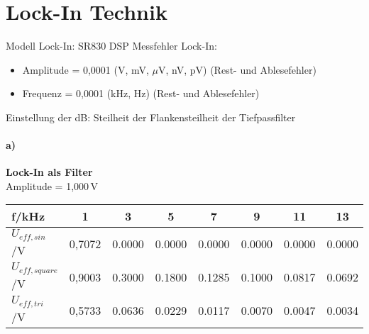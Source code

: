 \section*{Lock-In Technik}
Modell Lock-In: SR830 DSP
Messfehler Lock-In:
\begin{itemize}
    \item Amplitude = 0,0001 (V, mV, $\mu$V, nV, pV) (Rest- und Ablesefehler)
    \item Frequenz = 0,0001 (kHz, Hz) (Rest- und Ablesefehler)
\end{itemize}
Einstellung der dB: Steilheit der Flankensteilheit der Tiefpassfilter
\paragraph{a)}\textbf{Lock-In als Filter}\\
Amplitude = 1,000\,V
\begin{center}
    \begin{tabular}{l | c c c c c c c}
        f/kHz               & 1 & 3 & 5 & 7 & 9 & 11 & 13 \\
        \hline
        $U_{eff,sin}$/V     & 0,7072 & 0.0000 & 0.0000 & 0.0000 & 0.0000 & 0.0000 & 0.0000 \\
        $U_{eff,square}$/V  & 0,9003 & 0.3000 & 0.1800 & 0.1285 & 0.1000 & 0.0817 & 0.0692 \\
        $U_{eff,tri}$/V     & 0,5733 & 0.0636 & 0.0229 & 0.0117 & 0.0070 & 0.0047 & 0.0034 \\
    \end{tabular}
\end{center}
